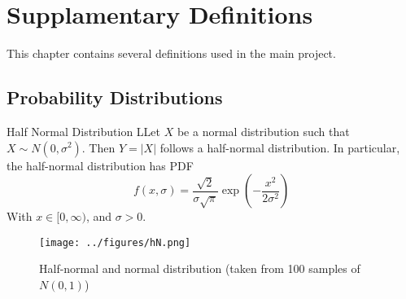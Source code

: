 \chapter{Supplamentary Definitions}\label{suppdefs}

This chapter contains several definitions used in the main project.

\section{Probability Distributions}

\begin{definition}{Half Normal Distribution}
    LLet $X$ be a normal distribution such that $X \sim N(0, \sigma^2)$. Then $Y = |X|$ follows a half-normal distribution. In particular, the half-normal distribution has PDF 
    \[
        f(x, \sigma) = \frac{\sqrt{2}}{\sigma \sqrt{\pi}}\exp \left(-\frac{x^2}{2\sigma^2}\right)    
    \]
    With $x \in [0, \infty)$, and $\sigma > 0$.
    \label{def:hndef}
\end{definition}

\begin{figure}[h]
    \centering
    \texttt{[image: ../figures/hN.png]}
    \caption{Half-normal and normal distribution (taken from 100 samples of $N(0,1)$)}
    \label{fig:hn}
\end{figure}
